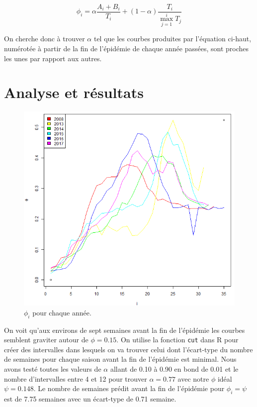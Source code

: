 \documentclass[12pt]{article}
\begin{document}
\[ \phi_i = \alpha\frac{A_i+B_i}{T_i} + (1-\alpha)\frac{T_i}{\max_{j=1}^i T_j} \]

On cherche donc \`a trouver $\alpha$ tel que les courbes produites par l'\'equation ci-haut,
num\'erot\'ee \`a partir de la fin de l'\'epid\'emie de chaque ann\'ee pass\'ees, sont proches
les unes par rapport aux autres.

\section{Analyse et r\'esultats}
\begin{figure}[h]
    \centering
    \includegraphics[width=5.5in]{PhiParAnnee.png}
    \caption{$\phi_i$ pour chaque ann\'ee.}
\end{figure}

On voit qu'aux environs de sept semaines avant la fin de l'\'epid\'emie les courbes semblent
graviter autour de $\phi = 0.15$. On utilise la fonction \texttt{cut} dans R\cite{R} pour cr\'eer des
intervalles dans lesquels on va trouver celui dont l'\'ecart-type du nombre de semaines pour chaque
saison avant la fin de l'\'epid\'emie est minimal. Nous avons test\'e toutes les valeurs de $\alpha$
allant de 0.10 \`a 0.90 en bond de 0.01 et le nombre d'intervalles entre 4 et 12 pour trouver
$\alpha = 0.77$ avec notre $\phi$ id\'eal $\psi = 0.148$.  Le nombre de semaines pr\'edit avant la
fin de l'\'epid\'emie pour $\phi_i = \psi$ est de 7.75 semaines avec un \'ecart-type de 0.71
semaine.
\end{document}
